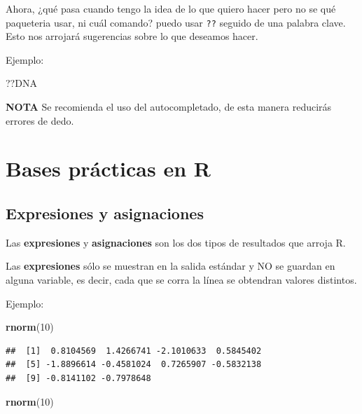 \documentclass[
]{book}
\newenvironment{Shaded}{\begin{snugshade}}{\end{snugshade}}
\newcommand{\DecValTok}[1]{\textcolor[rgb]{0.00,0.00,0.81}{#1}}
\newcommand{\FunctionTok}[1]{\textcolor[rgb]{0.13,0.29,0.53}{\textbf{#1}}}
\newcommand{\NormalTok}[1]{#1}
\begin{document}
Ahora, ¿qué pasa cuando tengo la idea de lo que quiero hacer pero no se qué paqueteria usar, ni cuál comando? puedo usar \texttt{??} seguido de una palabra clave. Esto nos arrojará sugerencias sobre lo que deseamos hacer.

Ejemplo:

\begin{Shaded}
\begin{Highlighting}[]
\NormalTok{??DNA}
\end{Highlighting}
\end{Shaded}

\textbf{NOTA} Se recomienda el uso del autocompletado, de esta manera reducirás errores de dedo.

\chapter{Bases prácticas en R}\label{bases-pruxe1cticas-en-r}

\section{Expresiones y asignaciones}\label{expresiones-y-asignaciones}

Las \textbf{expresiones} y \textbf{asignaciones} son los dos tipos de resultados que arroja R.

Las \textbf{expresiones} sólo se muestran en la salida estándar y NO se guardan en alguna variable, es decir, cada que se corra la línea se obtendran valores distintos.

Ejemplo:

\begin{Shaded}
\begin{Highlighting}[]
\FunctionTok{rnorm}\NormalTok{(}\DecValTok{10}\NormalTok{)}
\end{Highlighting}
\end{Shaded}

\begin{verbatim}
##  [1]  0.8104569  1.4266741 -2.1010633  0.5845402
##  [5] -1.8896614 -0.4581024  0.7265907 -0.5832138
##  [9] -0.8141102 -0.7978648
\end{verbatim}

\begin{Shaded}
\begin{Highlighting}[]
\FunctionTok{rnorm}\NormalTok{(}\DecValTok{10}\NormalTok{)}
\end{Highlighting}
\end{Shaded}
\end{document}
